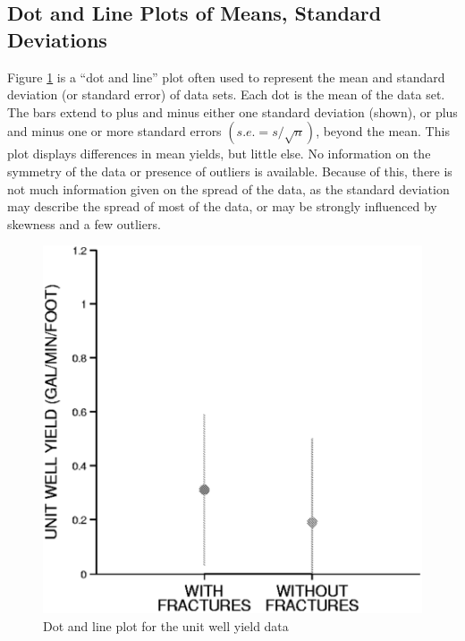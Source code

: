\documentclass[]{book}
\begin{document}
\hypertarget{dot-and-line-plots-of-means-standard-deviations}{%
\subsection{Dot and Line Plots of Means, Standard Deviations}\label{dot-and-line-plots-of-means-standard-deviations}}

Figure \ref{fig:fig-2-17} is a ``dot and line'' plot often used to represent the mean and standard deviation (or standard error) of data sets. Each dot is the mean of the data set. The bars extend to plus and minus either one standard deviation (shown), or plus and minus one or more standard errors \((s.e. = s / \sqrt{n})\), beyond the mean. This plot displays differences in mean yields, but little else. No information on the symmetry of the data or presence of outliers is available. Because of this, there is not much information given on the spread of the data, as the standard deviation may describe the spread of most of the data, or may be strongly influenced by skewness and a few outliers.

\begin{figure}

{\centering \includegraphics[width=12.22in]{figures/2_17} 

}

\caption{Dot and line plot for the unit well yield data}\label{fig:fig-2-17}
\end{figure}
\end{document}
